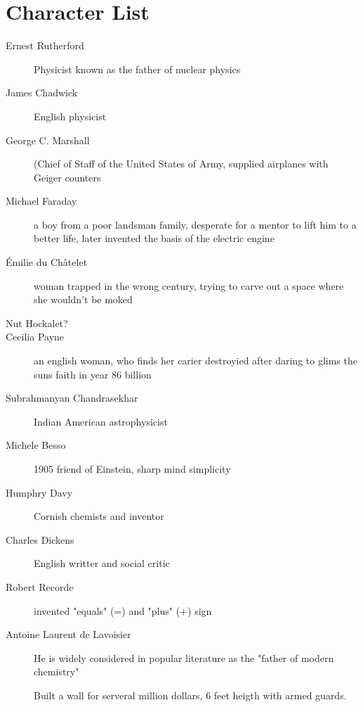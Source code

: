 %

\chapter{Character List}

\begin{description}
	
	\item[Ernest Rutherford] Physicist known as the father of nuclear physics
	\item[James Chadwick] English physicist
	
	\item[George C. Marshall] (Chief of Staff of the United States of Army, supplied airplanes with Geiger counters
	
	\item[Michael Faraday] a boy from a poor landsman family, desperate for a mentor to lift him to a better life, later invented the basis of the electric engine
	
	\item[Émilie du Châtelet] woman trapped in the wrong century, trying to carve out a space where she wouldn't be moked
	
	\item [Nut Hockalet?]
	
	\item[Cecilia Payne] an english woman, who finds her carier destroyied after daring to glims the suns faith in year 86 billion
	
	\item[Subrahmanyan Chandrasekhar] Indian American astrophysicist
	
	\item [Michele Besso] 1905 friend of Einstein, sharp mind simplicity
	
	\item[Humphry Davy] Cornish chemists and inventor
	
	\item[Charles Dickens] English writter and social critic
	
	\item[Robert Recorde] invented "equals" (=) and "plus" (+) sign
	
	\item[Antoine Laurent de Lavoisier] He is widely considered in popular literature as the "father of modern chemistry"
	
	Built a wall for serveral million dollars, 6 feet heigth with armed guards.
	

\end{description}
